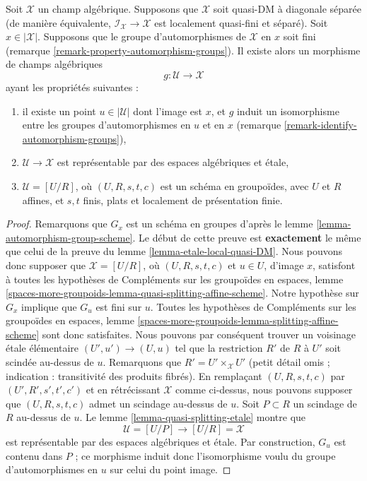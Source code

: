 \begin{lemma}
\label{lemma-etale-local-quasi-DM-at-x}
Soit $\mathcal{X}$ un champ alg\'ebrique. Supposons que $\mathcal{X}$ soit
quasi-DM \`a diagonale s\'epar\'ee (de mani\`ere \'equivalente,
$\mathcal{I}_\mathcal{X} \to \mathcal{X}$ est localement quasi-fini et
s\'epar\'e). Soit $x \in |\mathcal{X}|$. Supposons que le
groupe d'automorphismes de $\mathcal{X}$ en $x$ soit fini
(remarque \ref{remark-property-automorphism-groups}).
Il existe alors un morphisme de champs alg\'ebriques
$$
g : \mathcal{U} \longrightarrow \mathcal{X}
$$
ayant les propri\'et\'es suivantes :
\begin{enumerate}
\item il existe un point $u \in |\mathcal{U}|$ dont l'image est $x$, et
$g$ induit un isomorphisme entre les groupes d'automorphismes en $u$ et en $x$
(remarque \ref{remark-identify-automorphism-groups}),
\item $\mathcal{U} \to \mathcal{X}$ est repr\'esentable par des espaces alg\'ebriques et
\'etale,
\item $\mathcal{U} = [U/R]$, o\`u $(U, R, s, t, c)$ est un sch\'ema
en groupo\"ides, avec $U$ et $R$ affines, et $s, t$ finis, plats et
localement de pr\'esentation finie.
\end{enumerate}
\end{lemma}

\begin{proof}
Remarquons que $G_x$ est un sch\'ema en groupes d'apr\`es
le lemme \ref{lemma-automorphism-group-scheme}.
Le d\'ebut de cette preuve est {\bf exactement} le m\^eme que celui de la preuve
du lemme \ref{lemma-etale-local-quasi-DM}.
Nous pouvons donc supposer que $\mathcal{X} = [U/R]$, o\`u $(U, R, s, t, c)$
et $u \in U$, d'image $x$, satisfont \`a toutes les hypoth\`eses de
Compl\'ements sur les groupo\"ides en espaces, lemme
\ref{spaces-more-groupoids-lemma-quasi-splitting-affine-scheme}.
Notre hypoth\`ese sur $G_x$ implique que $G_u$ est fini sur $u$.
Toutes les hypoth\`eses de
Compl\'ements sur les groupo\"ides en espaces, lemme
\ref{spaces-more-groupoids-lemma-splitting-affine-scheme}
sont donc satisfaites.
Nous pouvons par cons\'equent trouver un voisinage \'etale \'el\'ementaire
$(U', u') \to (U, u)$ tel que la restriction $R'$ de $R$ \`a $U'$
soit scind\'ee au-dessus de $u$. Remarquons que $R' = U' \times_\mathcal{X} U'$
(petit d\'etail omis ; indication : transitivit\'e des produits fibr\'es).
En rempla\c{c}ant $(U, R, s, t, c)$ par $(U', R', s', t', c')$ et en r\'etr\'ecissant
$\mathcal{X}$ comme ci-dessus, nous pouvons supposer que $(U, R, s, t, c)$ admet
un scindage au-dessus de $u$. Soit $P \subset R$ un scindage de $R$ au-dessus de $u$.
Le lemme \ref{lemma-quasi-splitting-etale} montre que
$$
\mathcal{U} = [U/P] \longrightarrow [U/R] = \mathcal{X}
$$
est repr\'esentable par des espaces alg\'ebriques et \'etale. Par construction,
$G_u$ est contenu dans $P$ ; ce morphisme induit donc l'isomorphisme voulu
du groupe d'automorphismes en $u$ sur celui du point image.
\end{proof}

